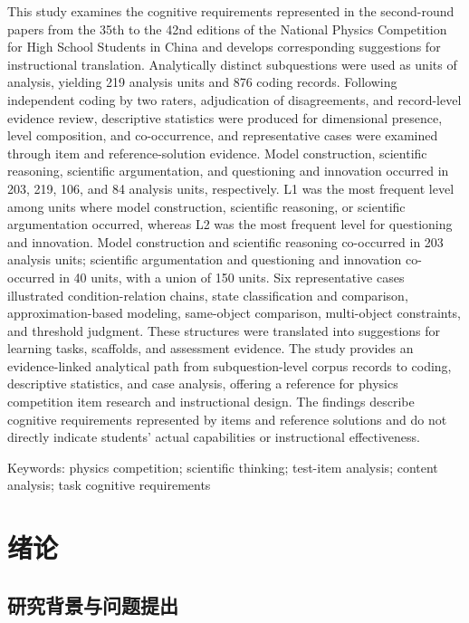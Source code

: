 \documentclass[
  12pt,
  a4paper]{ctexbook}
\begin{document}
This study examines the cognitive requirements represented in the
second-round papers from the 35th to the 42nd editions of the National
Physics Competition for High School Students in China and develops
corresponding suggestions for instructional translation. Analytically
distinct subquestions were used as units of analysis, yielding 219
analysis units and 876 coding records. Following independent coding by
two raters, adjudication of disagreements, and record-level evidence
review, descriptive statistics were produced for dimensional presence,
level composition, and co-occurrence, and representative cases were
examined through item and reference-solution evidence. Model
construction, scientific reasoning, scientific argumentation, and
questioning and innovation occurred in 203, 219, 106, and 84 analysis
units, respectively. L1 was the most frequent level among units where
model construction, scientific reasoning, or scientific argumentation
occurred, whereas L2 was the most frequent level for questioning and
innovation. Model construction and scientific reasoning co-occurred in
203 analysis units; scientific argumentation and questioning and
innovation co-occurred in 40 units, with a union of 150 units. Six
representative cases illustrated condition-relation chains, state
classification and comparison, approximation-based modeling, same-object
comparison, multi-object constraints, and threshold judgment. These
structures were translated into suggestions for learning tasks,
scaffolds, and assessment evidence. The study provides an
evidence-linked analytical path from subquestion-level corpus records to
coding, descriptive statistics, and case analysis, offering a reference
for physics competition item research and instructional design. The
findings describe cognitive requirements represented by items and
reference solutions and do not directly indicate students' actual
capabilities or instructional effectiveness.

Keywords: physics competition; scientific thinking; test-item analysis;
content analysis; task cognitive requirements

\chapter{绪论}\label{ux7eeaux8bba}

\section{研究背景与问题提出}\label{ux7814ux7a76ux80ccux666fux4e0eux95eeux9898ux63d0ux51fa}
\end{document}
